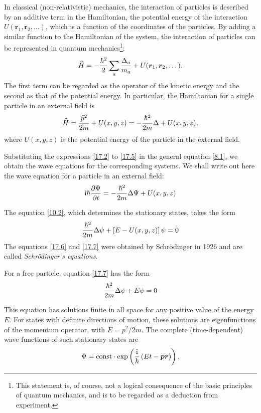 In classical (non-relativistic) mechanics, the interaction of particles is described by an additive term in the Hamiltonian, the potential energy of the interaction $ U(\bm{r}_1, \bm{r}_2,\dots) $, which is a function of the coordinates of the particles. By adding a similar function to the Hamiltonian of the system, the interaction of particles can be represented in quantum mechanics\footnote{This statement is, of course, not a logical consequence of the basic principles of quantum mechanics, and is to be regarded as a deduction from experiment.
}:
\begin{equation}\label{17.4}
\widehat{H}=-\frac{\hbar^2}{2}\sum_{a}\frac{\Delta_a}{m_a}+U(\bm{r}_1, \bm{r}_2,\dots).
\end{equation}
The first term can be regarded as the operator of the kinetic energy and the second as that of the potential energy. In particular, the Hamiltonian for a single particle in an external field is
\begin{equation}\label{17.5}
\widehat{H}=\frac{\widehat{p}^2}{2m}+U(x,y,z)=-\frac{\hbar^2}{2m}\Delta+U(x,y,z),
\end{equation}
where $ U(x,y,z) $ is the potential energy of the particle in the external field.

Substituting the expressions \eqref{17.2} to \eqref{17.5} in the general equation \eqref{8.1}, we obtain the wave equations for the corresponding systems. We shall write out here the wave equation for a particle in an external field:
\begin{equation}\label{17.6}
\mathrm{i}\hbar\frac{\partial \Psi}{\partial t}=-\frac{\hbar^2}{2m}\Delta\Psi+U(x,y,z)
\end{equation}


The equation \eqref{10.2}, which determines the stationary states, takes the form
\begin{equation}\label{17.7}
\frac{\hbar^2}{2m}\Delta\psi+\left[ E-U(x,y,z)\right]\psi=0
\end{equation}
The equations \eqref{17.6} and \eqref{17.7} were obtained by Schr\"odinger in 1926 and are called \textit{Schr\"odinger's equations}.

For a free particle, equation \eqref{17.7} has the form
\begin{equation}\label{17.8}
\frac{\hbar^2}{2m}\Delta\psi+E\psi=0
\end{equation}


This equation has solutions finite in all space for any positive value of the energy $ E $. For states with definite directions of motion, these solutions are eigenfunctions of the momentum operator, with $ E = p^2/2m $. The complete (time-dependent) wave functions of such stationary states are
\begin{equation}\label{17.9}
\Psi=\text{const}\cdot\exp\left(\frac{\mathrm{i}}{\hbar}\left(Et-\bm{p}\bm{r}\right)\right).
\end{equation}


